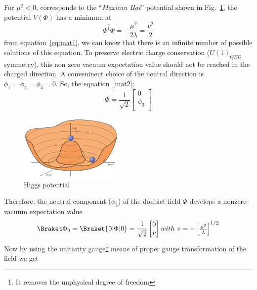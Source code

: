 For $\mu^2<0$, corresponds to the ``\textit{Maxican Hat}'' potential shown in Fig.~\ref{fig:higgsPotential}, the potential $V(\Phi)$ has a minimum at
\begin{equation}
    \Phi^{\dagger}\Phi = -\frac{\mu^2}{2\lambda}=\frac{v^2}{2}
\end{equation}
from equation~\ref{eq:mat1}, we can know that there is an infinite number of possible solutions of this equation. To preserve electric charge conservation ($U(1)_{QED}$ symmetry), this non zero vacuum expectation value should not be reached in the charged direction. A conveninent choice of the neutral direction is $\phi_1 = \phi_2 = \phi_4 = 0$. So, the equation~\ref{mat2}:
\begin{equation}
    \Phi=\frac{1}{\sqrt{2}}
        \begin{bmatrix}
        0   \\
        \phi_3  \\
        \end{bmatrix}
\end{equation}
\begin{figure}[!htbp]
    \centering
    \includegraphics[width=0.45\textwidth]{figures/Intro/higgspotential.png}
    \caption{Higgs potential}
    \label{fig:higgsPotential}
\end{figure}
Therefore, the neutral component ($\phi_3$) of the doublet field $\Phi$ develops a nonzero vacuum expectation value
\begin{equation}
    {\Braket\Phi}_0 = \Braket{0|\Phi|0}=\frac{1}{\sqrt{2}}
        \begin{bmatrix}
        0   \\
        v   \\
        \end{bmatrix}
        with~
        v=-
        \begin{bmatrix}
        \frac{\mu^2}{\lambda}
        \end{bmatrix}
        ^{1/2}
\end{equation}
Now by using the unitarity gauge\footnote{It removes the unphysical degree of freedom} means of proper gauge transformation of the field we get
